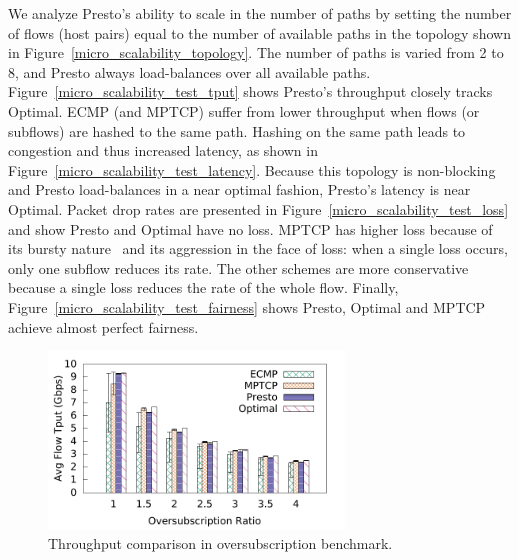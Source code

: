 We analyze Presto's ability to scale in the number of paths by
setting the number of flows (host pairs) equal to the number of available paths in the topology shown in 
Figure~\ref{micro_scalability_topology}. The number of paths is varied from 2 to 8, and 
Presto always load-balances over all available paths.
Figure~\ref{micro_scalability_test_tput} shows Presto's throughput closely tracks Optimal. 
ECMP (and MPTCP) suffer from lower throughput when flows (or subflows) are
hashed to the same path. Hashing on the same path leads to congestion and thus increased latency, as shown in Figure~\ref{micro_scalability_test_latency}.
Because this topology is non-blocking and Presto load-balances in a near optimal fashion, Presto's latency
is near Optimal. Packet drop rates are presented in Figure~\ref{micro_scalability_test_loss} and show
Presto and Optimal have no loss. MPTCP has higher loss because of its bursty nature~\cite{conga}
and its aggression in the face of loss: when a single loss occurs, only
one subflow reduces its rate. The other schemes are more conservative because a single loss reduces the rate of the whole flow.
Finally, Figure~\ref{micro_scalability_test_fairness} shows Presto, Optimal and MPTCP
achieve almost perfect fairness.


\begin{figure}[!t]
        \centering
  \includegraphics[width=0.7\textwidth]{presto/figures/congestion_test/congestion_compare_tput_witherrbar.pdf}
        \caption{Throughput comparison in oversubscription benchmark.}
        \label{micro_congestion_test_tput}
\end{figure}


